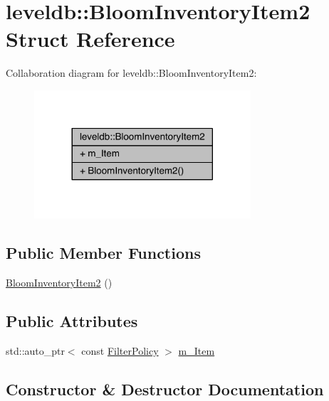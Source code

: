 \hypertarget{structleveldb_1_1_bloom_inventory_item2}{}\section{leveldb\+:\+:Bloom\+Inventory\+Item2 Struct Reference}
\label{structleveldb_1_1_bloom_inventory_item2}


Collaboration diagram for leveldb\+:\+:Bloom\+Inventory\+Item2\+:\nopagebreak
\begin{figure}[H]
\begin{center}
\leavevmode
\includegraphics[width=228pt]{structleveldb_1_1_bloom_inventory_item2__coll__graph}
\end{center}
\end{figure}
\subsection*{Public Member Functions}
\begin{DoxyCompactItemize}
\item 
\hyperlink{structleveldb_1_1_bloom_inventory_item2_ab6c572ce09606646bec485fe6672a8c1}{Bloom\+Inventory\+Item2} ()
\end{DoxyCompactItemize}
\subsection*{Public Attributes}
\begin{DoxyCompactItemize}
\item 
std\+::auto\+\_\+ptr$<$ const \hyperlink{classleveldb_1_1_filter_policy}{Filter\+Policy} $>$ \hyperlink{structleveldb_1_1_bloom_inventory_item2_a8c44b6dd3e2c2ae8d95530c2014a7aa5}{m\+\_\+\+Item}
\end{DoxyCompactItemize}


\subsection{Constructor \& Destructor Documentation}
\hypertarget{structleveldb_1_1_bloom_inventory_item2_ab6c572ce09606646bec485fe6672a8c1}{}
